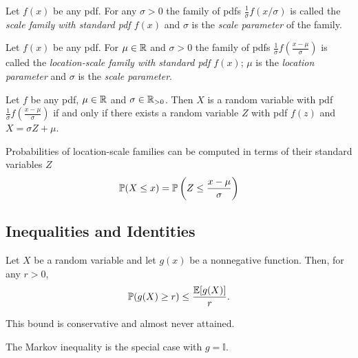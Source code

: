 \begin{definition}
    Let $f(x)$ be any pdf. For any $\sigma > 0$ the family of pdfs $\frac{1}{\sigma} f(x/\sigma)$ is called the \emph{scale family with standard pdf $f(x)$} and $\sigma$ is the \emph{scale parameter} of the family.
\end{definition}

\begin{definition}
    Let $f(x)$ be any pdf. For $\mu \in \R{}$ and $\sigma > 0$ the family of pdfs $\frac{1}{\sigma} f(\frac{x - \mu}{\sigma})$ is called the \emph{location-scale family with standard pdf $f(x)$}; $\mu$ is the \emph{location parameter} and $\sigma$ is the \emph{scale parameter}.
\end{definition}

\begin{theorem}[Standardisation]
    Let $f$ be any pdf, $\mu \in \R{}$ and $\sigma \in \R{}_{>0}$. Then $X$ is a random variable with pdf $\frac{1}{\sigma}f(\frac{x - \mu}{\sigma})$ if and only if there exists a random variable $Z$ with pdf $f(z)$ and $X = \sigma Z + \mu$.
\end{theorem}

\begin{remark}
    Probabilities of location-scale families can be computed in terms of their standard variables $Z$
    \[
        \P{}(X \leq x) = \P{}\left(Z \leq \frac{x - \mu}{\sigma} \right)
    \]
\end{remark}

\subsection{Inequalities and Identities}

\begin{theorem}
    Let $X$ be a random variable and let $g(x)$ be a nonnegative function. Then, for any $r > 0$,
    \[
        \P{}(g(X) \geq r) \leq \frac{\E{}[g(X)]}{r}.
    \]
\end{theorem}

\begin{remark}
    This bound is conservative and almost never attained. 
\end{remark}

\begin{remark}   
    The Markov inequality is the special case with $g = \mathbb{I}$.
\end{remark}

